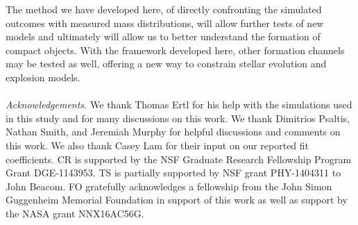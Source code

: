 \documentclass[]{emulateapj}
\begin{document}
The method we have developed here, of directly confronting the simulated outcomes with measured mass distributions, will allow further tests of new models and ultimately will allow us to better understand the formation of compact objects. With the framework developed here, other formation channels may be tested as well, offering a new way to constrain stellar evolution and explosion models.
\\\\{\em{Acknowledgements.\/}} We thank Thomas Ertl for his help with the simulations used in this study and for many discussions on this work. We thank Dimitrios Psaltis, Nathan Smith, and Jeremiah Murphy for helpful discussions and comments on this work. We also thank Casey Lam for their input on our reported fit coefficients. CR is supported by the NSF Graduate Research Fellowship Program Grant DGE-1143953. TS is partially supported by NSF grant PHY-1404311 to John Beacom. FO gratefully acknowledges a fellowship from the John Simon Guggenheim Memorial Foundation in support of this work as well as support by the NASA grant NNX16AC56G.



\end{document}
